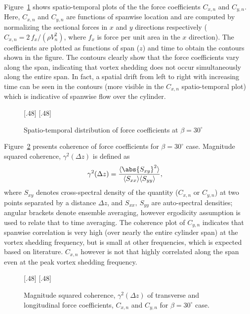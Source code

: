 Figure~\ref{fig:Spatial_temporal_CxCyRe20k} shows spatio-temporal plots of the
the force coefficients $C_{x,n}$ and $C_{y,n}$. Here, $C_{x,n}$ and $C_{y,n}$
are functions of spanwise location and are computed by normalizing the
sectional forces in $x$ and $y$ directions respectively ($C_{x,n} = 2\, f_x/
(\rho V^2_n)$, where $f_x$ is force per unit area in the $x$
direction). The coefficients are plotted as functions of span ($z$) and time to
obtain the contours shown in the figure. The contours clearly show that the
force coefficients vary along the span, indicating that vortex shedding does
not occur simultaneously along the entire span. In fact, a spatial drift from
left to right with increasing time can be seen in the contours (more visible in
the $C_{x,n}$ spatio-temporal plot) which is indicative of spanwise flow over
the cylinder.
%
\begin{figure}[htb!]
    [.48\linewidth]{}
  \hspace*{\fill}
    [.48\linewidth]{}
  \caption{Spatio-temporal distribution of force coefficients at
  $\beta=30^\circ$}
  \label{fig:Spatial_temporal_CxCyRe20k}
\end{figure}

Figure~\ref{fig:Coherence_Yawed30_Re20k} presents coherence of force
coefficients for $\beta=30^\circ$ case. Magnitude squared coherence,
$\gamma^2(\Delta z)$ is defined as
%
\begin{align}
  \gamma^2(\Delta z) &= \frac{\langle \abs{S_{xy}}^2 \rangle}{\langle
    S_{xx}\rangle \langle S_{yy} \rangle},
  \label{eq:coherence}
\end{align}
%
where $S_{xy}$ denotes cross-spectral density of the quantity ($C_{x,n}$ or
$C_{y,n}$) at two points separated by a distance $\Delta z$, and
$S_{xx},~S_{yy}$ are auto-spectral densities; angular brackets denote ensemble
averaging, however ergodicity assumption is used to relate that to time
averaging. The coherence plot of $C_{y,n}$ indicates that spanwise correlation
is very high (over nearly the entire cylinder span) at the vortex shedding
frequency, but is small at other frequencies, which is expected based on
literature. $C_{x,n}$ however is not that highly correlated along the span even
at the peak vortex shedding frequency.
%
\begin{figure}[htb!]
    [.48\linewidth]{}
  \hspace*{\fill}
    [.48\linewidth]{}
    \caption{Magnitude squared coherence, $\gamma^2(\Delta z)$ of transverse
      and longitudinal force coefficients, $C_{x,n}$ and $C_{y,n}$ for
      $\beta=30^\circ$ case.}
  \label{fig:Coherence_Yawed30_Re20k}
\end{figure}
